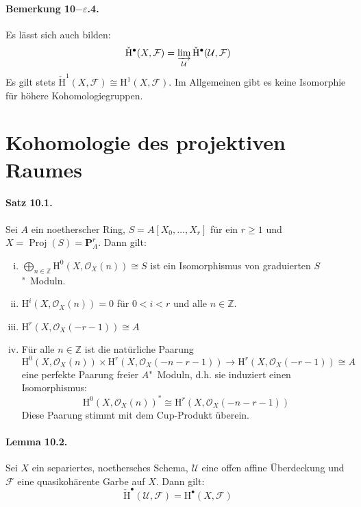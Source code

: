 \paragraph{Bemerkung 10$-\varepsilon$.4.}\label{9.5.4} Es lässt sich auch bilden:
\[\check{\mathrm{H}}^\bullet(X,\mathcal{F}) = \varinjlim_{\mathcal{U}}\check{\mathrm{H}}^\bullet(\mathcal{U},\mathcal{F}) \]
Es gilt stets $\check{\mathrm{H}}^1(X,\mathcal{F})\cong \mathrm{H}^1(X,\mathcal{F})$. Im Allgemeinen gibt es keine Isomorphie für höhere Kohomologiegruppen.

\section{Kohomologie des projektiven Raumes}

\paragraph{Satz 10.1.}\label{10.1} Sei $A$ ein noetherscher Ring, $S=A[X_0,\ldots,X_r]$ für ein $r\geq 1$ und $X=\operatorname{Proj}(S)=\mathbf{P}_A^r$. Dann gilt:
\begin{enumerate}[(i)]
\item $\bigoplus_{n\in\mathbb{Z}} \mathrm{H}^0(X,\mathcal{O}_X(n))\cong S$ ist ein Isomorphismus von graduierten $S$"~Moduln.
\item $\mathrm{H}^i(X,\mathcal{O}_X(n))=0$ für $0<i<r$ und alle $n\in\mathbb{Z}$.
\item $\mathrm{H}^r(X,\mathcal{O}_X(-r-1))\cong A$
\item Für alle $n\in\mathbb{Z}$ ist die natürliche Paarung
\[ \mathrm{H}^0(X,\mathcal{O}_X(n))\times\mathrm{H}^r(X,\mathcal{O}_X(-n-r-1))\to\mathrm{H}^r(X,\mathcal{O}_X(-r-1))\cong A \]
eine perfekte Paarung freier $A$"~Moduln, d.h. sie induziert einen Isomorphismus:
\[\mathrm{H}^0(X,\mathcal{O}_X(n))^\ast\cong \mathrm{H}^r(X,\mathcal{O}_X(-n-r-1)) \]
Diese Paarung stimmt mit dem Cup-Produkt überein.
\end{enumerate}

\paragraph{Lemma 10.2.}\label{10.2} Sei $X$ ein separiertes, noethersches Schema, $\mathcal{U}$ eine offen affine Überdeckung und $\mathcal{F}$ eine quasikohärente Garbe auf $X$. Dann gilt:
\[\check{\mathrm{H}}^\bullet(\mathcal{U},\mathcal{F}) = \mathrm{H}^\bullet(X,\mathcal{F}) \]

